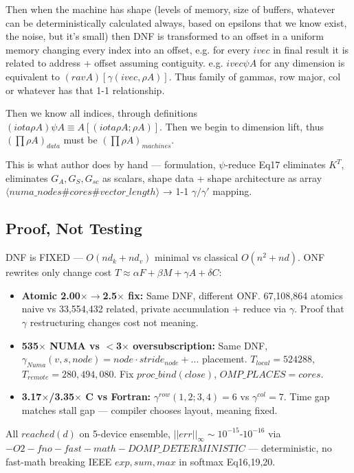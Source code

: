 \documentclass[11pt]{article}
\begin{document}
Then when the machine has shape (levels of memory, size of buffers, whatever can be deterministically calculated always, based on epsilons that we know exist, the noise, but it's small) then DNF is transformed to an offset in a uniform memory changing every index into an offset, e.g. for every $ivec$ in final result it is related to address + offset assuming contiguity. e.g. $ivec \psi A$ for any dimension is equivalent to $(rav A)[\gamma(ivec,\rho A)]$. Thus family of gammas, row major, col or whatever has that 1-1 relationship.

Then we know all indices, through definitions $(iota \rho A)\psi A \equiv A[(iota \rho A; \rho A)]$. Then we begin to dimension lift, thus $(\prod \rho A)_{data}$ must be $(\prod \rho A)_{machines}$.

This is what author does by hand — formulation, $\psi$-reduce Eq17 eliminates $K^T$, eliminates $G_A,G_S,G_{sc}$ as scalars, shape data + shape architecture as array $\langle numa\_nodes\# cores\# vector\_length\rangle$ → 1-1 $\gamma/\gamma'$ mapping.

\subsection{Proof, Not Testing}

DNF is FIXED — $O(nd_k+nd_v)$ minimal vs classical $O(n^2+nd)$. ONF rewrites only change cost $T\approx\alpha F+\beta M+\gamma A+\delta C$:

\begin{itemize}
\item \textbf{Atomic 2.00$\times\rightarrow$2.5$\times$ fix:} Same DNF, different ONF. 67,108,864 atomics naive vs 33,554,432 related, private accumulation + reduce via $\gamma$. Proof that $\gamma$ restructuring changes cost not meaning.
\item \textbf{535$\times$ NUMA vs $<$3$\times$ oversubscription:} Same DNF, $\gamma_{Numa}(v,s,node)=node\cdot stride_{node}+...$ placement. $T_{local}=524288$, $T_{remote}=280,494,080$. Fix $proc\_bind(close)$, $OMP\_PLACES=cores$.
\item \textbf{3.17$\times$/3.35$\times$ C vs Fortran:} $\gamma^{row}(1,2;3,4)=6$ vs $\gamma^{col}=7$. Time gap matches stall gap — compiler chooses layout, meaning fixed.
\end{itemize}

All $reached(d)$ on 5-device ensemble, $||err||_\infty\sim10^{-15}$-$10^{-16}$ via $-O2 -fno-fast-math -DOMP\_DETERMINISTIC$ — deterministic, no fast-math breaking IEEE $exp,sum,max$ in softmax Eq16,19,20.
\end{document}
